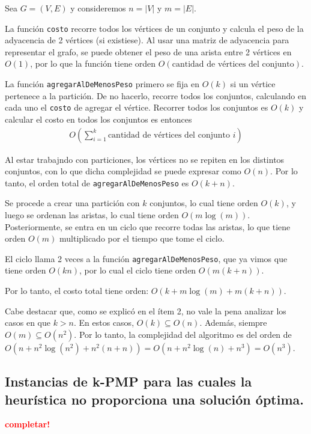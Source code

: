 Sea $G = (V, E)$ y consideremos $n = |V|$ y $m = |E|$.

La función \texttt{costo} recorre todos los vértices de un conjunto y calcula
el peso de la adyacencia de 2 vértices (si existiese). Al usar una matriz de
adyacencia para representar el grafo, se puede obtener el peso de una arista
entre 2 vértices en $O(1)$, por lo que la función tiene orden $O(\text{cantidad
de vértices del conjunto})$.

La función \texttt{agregarAlDeMenosPeso} primero se fija en $O(k)$ si un
vértice pertenece a la partición. De no hacerlo, recorre todos los conjuntos,
calculando en cada uno el \texttt{costo} de agregar el vértice. Recorrer todos
los conjuntos es $O(k)$ y calcular el costo en todos los conjuntos es entonces
\begin{align*}
  O(\sum_{i=1}^k \text{cantidad de vértices del conjunto } i)
\end{align*}

Al estar trabajndo con particiones, los vértices no se repiten en los distintos
conjuntos, con lo que dicha complejidad se puede expresar como $O(n)$. Por lo
tanto, el orden total de \texttt{agregarAlDeMenosPeso} es $O(k + n)$.

Se procede a crear una partición con $k$ conjuntos, lo cual tiene orden $O(k)$,
y luego se ordenan las aristas, lo cual tiene orden $O(m\log(m))$.
Posteriormente, se entra en un ciclo que recorre todas las aristas, lo que tiene
orden $O(m)$ multiplicado por el tiempo que tome el ciclo.

El ciclo llama 2 veces a la función \texttt{agregarAlDeMenosPeso}, que ya vimos
que tiene orden $O(kn)$, por lo cual el ciclo tiene orden $O(m(k + n))$.

Por lo tanto, el costo total tiene orden: $O(k + m\log(m) + m(k + n))$.

Cabe destacar que, como se explicó en el ítem 2, no vale la pena analizar los
casos en que $k > n$. En estos casos, $O(k) \subseteq O(n)$. Además, siempre
$O(m) \subseteq O(n^2)$. Por lo tanto, la complejidad del algoritmo es del
orden de $O(n + n^2 \log(n^2) + n^2 (n + n)) = O(n + n^2 \log(n) + n^3) =
O(n^3)$.

\newpage
\subsection{Instancias de k-PMP para las cuales la heurística no proporciona
            una solución óptima.}
\vspace*{0.3cm}
\textcolor{red}{\textbf{completar!}}

